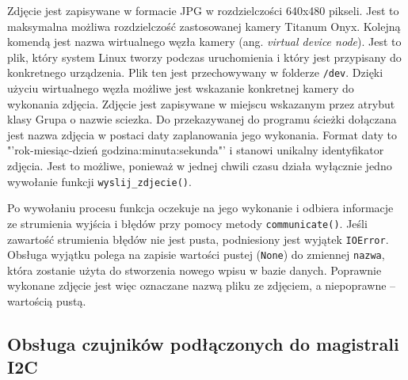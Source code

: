 \documentclass[a4paper,11pt,twoside]{article}
\begin{document}
Zdjęcie jest zapisywane w formacie JPG w rozdzielczości 640x480 pikseli. Jest to maksymalna możliwa rozdzielczość zastosowanej kamery Titanum Onyx. Kolejną komendą jest nazwa wirtualnego węzła kamery (ang. \textit{virtual device node}). Jest to plik, który system Linux tworzy podczas uruchomienia i który jest przypisany do konkretnego urządzenia. Plik ten jest przechowywany w folderze \texttt{/dev}. Dzięki użyciu wirtualnego węzła możliwe jest wskazanie konkretnej kamery do wykonania zdjęcia. Zdjęcie jest zapisywane w miejscu wskazanym przez atrybut klasy Grupa o nazwie sciezka. Do przekazywanej do programu ścieżki dołączana jest nazwa zdjęcia w postaci daty zaplanowania jego wykonania. Format daty to "'rok-miesiąc-dzień godzina:minuta:sekunda"' i stanowi unikalny identyfikator zdjęcia. Jest to możliwe, ponieważ w jednej chwili czasu działa wyłącznie jedno wywołanie funkcji \texttt{wyslij{\_}zdjecie()}.

Po wywołaniu procesu funkcja oczekuje na jego wykonanie i odbiera informacje ze strumienia wyjścia i błędów przy pomocy metody \texttt{communicate()}. Jeśli zawartość strumienia błędów nie jest pusta, podniesiony jest wyjątek \texttt{IOError}. Obsługa wyjątku polega na zapisie wartości pustej (\texttt{None}) do zmiennej \texttt{nazwa}, która zostanie użyta do stworzenia nowego wpisu w bazie danych. Poprawnie wykonane zdjęcie jest więc oznaczane nazwą pliku ze zdjęciem, a niepoprawne -- wartością pustą.
\subsection{Obsługa czujników podłączonych do magistrali I2C}
\end{document}
